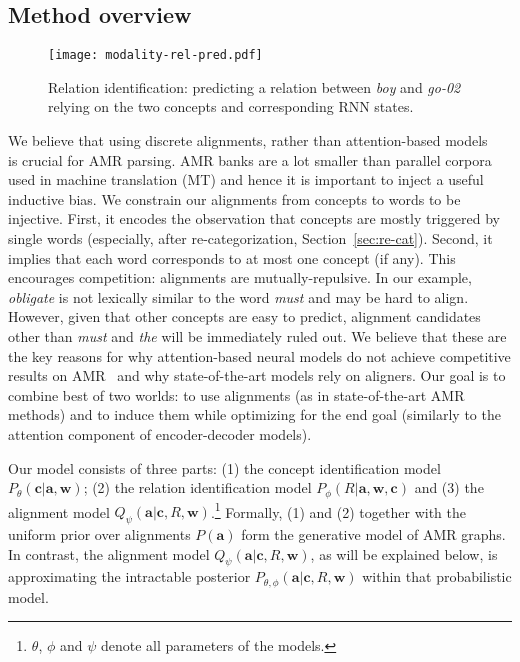 \documentclass[11pt,a4paper]{article}
\begin{document}
\subsection{Method overview}
\label{sec:overview}

\begin{figure}[h!]
\centering
\texttt{[image: modality-rel-pred.pdf]}
\vspace{-3ex}
\caption{Relation identification: predicting a relation between  {\it boy} and {\it go-02} relying on 
the two concepts and corresponding RNN states.}
\label{fig:rel-pred}
\end{figure}
We believe that using discrete alignments, rather than attention-based models ~\cite{bahdanau2014neural} is crucial for AMR parsing. AMR banks are a lot smaller than parallel corpora used in machine translation (MT) and hence it is important to inject a useful inductive bias. 
We constrain our alignments from concepts to words to be injective.
First, it encodes the observation that
concepts are mostly triggered by single words (especially, after re-categorization, Section~\ref{sec:re-cat}). 
Second, it implies that each word corresponds to at most one concept (if any). This encourages competition: alignments are mutually-repulsive. In our example, \textit{obligate} is not lexically similar to the word \textit{must} and may be hard to align. 
However, given that other concepts are easy to predict, 
alignment candidates other than
{\it must} and {\it the} will be immediately ruled out.
We believe that these are the key reasons for why attention-based neural models do not achieve competitive results on AMR~\cite{konstas-EtAl:2017:Long} and why state-of-the-art models rely on aligners. Our goal is to combine best of two worlds: to use alignments (as in state-of-the-art AMR methods) and to induce them while optimizing for the end goal (similarly to the attention component of encoder-decoder models). 




Our model consists of three parts: (1) the concept identification model
$P_\theta(\mathbf{c} | \mathbf{a}, \mathbf{w})$; (2) the relation identification model $P_\phi(R | \mathbf{a}, \mathbf{w}, \mathbf{c})$
and (3) the alignment model $Q_\psi(\mathbf{a} | \mathbf{c}, R, \mathbf{w})$.\footnote{$\theta$, $\phi$ and $\psi$ denote all parameters of the models.}
Formally, (1) and (2) together with the uniform prior over alignments $P(\mathbf{a})$ form the generative model of AMR graphs. In contrast,  the alignment model $Q_\psi(\mathbf{a} | \mathbf{c}, R, \mathbf{w})$, as will be explained below, is approximating the intractable posterior $P_{\theta,\phi}(\mathbf{a} |  \mathbf{c}, R, \mathbf{w})$ within that probabilistic model.
\end{document}
